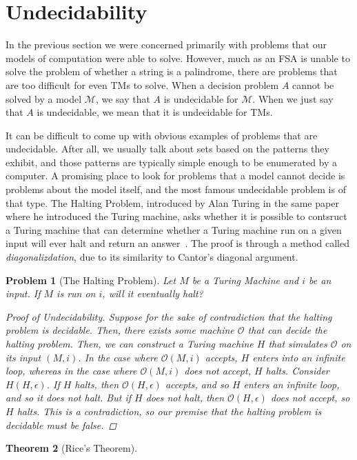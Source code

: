 \documentclass[psamsfonts]{amsart}
\newtheorem{thm}{Theorem}[section]
\newtheorem{prob}[thm]{Problem}
\theoremstyle{definition}
\theoremstyle{remark}
\numberwithin{equation}{section}
\begin{document}
\section{Undecidability}
In the previous section we were concerned primarily with problems that our
models of computation were able to solve. However, much as an \ac{FSA} is unable
to solve the problem of whether a string is a palindrome, there are problems
that are too difficult for even \aclp{TM} to solve. When a decision problem $A$
cannot be solved by a model $\mathcal{M}$, we say that $A$ is undecidable for
$\mathcal{M}$. When we just say that $A$ is undecidable, we mean that it is
undecidable for \acp{TM}. \par
It can be difficult to come up with obvious examples of problems that are
undecidable. After all, we usually talk about sets based on the patterns they
exhibit, and those patterns are typically simple enough to be enumerated by a
computer. A promising place to look for problems that a model cannot decide is
problems about the model itself, and the most famous undecidable problem is of
that type. The Halting Problem, introduced by Alan Turing in the same paper
where he introduced the Turing machine, asks whether it is possible to contsruct
a Turing machine that can determine whether a Turing machine run on a given
input will ever halt and return an
answer~\cite{turing37_comput_number_with_applic_to_entsc}. The proof is through
a method called \emph{diagonalizdation}, due to its similarity to Cantor's
diagonal argument. 

\begin{prob}[The Halting Problem]
  \label{prob:halting}
  Let $M$ be a Turing Machine and $i$ be an input. If $M$ is run on $i$, will it
  eventually halt?
  \begin{proof}[Proof of Undecidability]
    Suppose for the sake of contradiction that the halting problem is
    decidable. Then, there exists some machine
    $\mathcal{O}$ that can decide the halting problem. Then, we can construct a
    Turing machine $H$ that simulates $\mathcal{O}$ on its input $(M,i)$. In the
    case where $\mathcal{O}(M,i)$ accepts, $H$ enters into an infinite
    loop, whereas in the case where $\mathcal{O}(M,i)$ does not accept, $H$
    halts. Consider $H(H,\epsilon)$. If $H$ halts, then
    $\mathcal{O}(H,\epsilon)$ accepts, and so $H$ enters an infinite loop, and
    so it does not halt. But if $H$ does not halt, then
    $\mathcal{O}(H,\epsilon)$ does not accept, so $H$ halts. This is a
    contradiction, so our premise that the halting problem is decidable must be false.
  \end{proof}
  
  \cite{sipser13:_introd_theor_comput}
\end{prob}
\begin{thm}[Rice's Theorem] \cite{kozen99_autom}
\end{thm}
\end{document}
